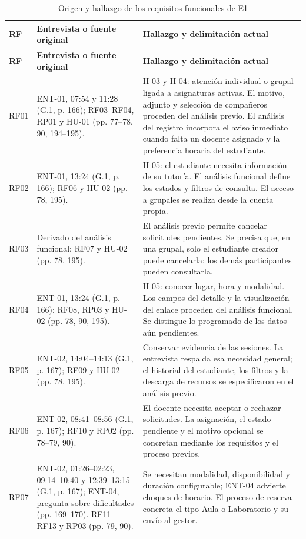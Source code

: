 \begingroup
\small
{}
\begin{longtable}{@{}p{}p{}p{}@{}}
\caption{Origen y hallazgo de los requisitos funcionales de E1}
\label{tab:anexo-origen-rf}\\
\toprule
\textbf{RF} & \textbf{Entrevista o fuente original} & \textbf{Hallazgo y delimitación actual}\\
\midrule
\endfirsthead
\toprule
\textbf{RF} & \textbf{Entrevista o fuente original} & \textbf{Hallazgo y delimitación actual}\\
\midrule
\endhead
RF01 & ENT-01, 07:54 y 11:28 (G.1, p. 166); RF03--RF04, RP01 y HU-01 (pp. 77--78, 90, 194--195). & H-03 y H-04: atención individual o grupal ligada a asignaturas activas. El motivo, adjunto y selección de compañeros proceden del análisis previo. El análisis del registro incorpora el aviso inmediato cuando falta un docente asignado y la preferencia horaria del estudiante.\\
RF02 & ENT-01, 13:24 (G.1, p. 166); RF06 y HU-02 (pp. 78, 195). & H-05: el estudiante necesita información de su tutoría. El análisis funcional define los estados y filtros de consulta. El acceso a grupales se realiza desde la cuenta propia.\\
RF03 & Derivado del análisis funcional: RF07 y HU-02 (pp. 78, 195). & El análisis previo permite cancelar solicitudes pendientes. Se precisa que, en una grupal, solo el estudiante creador puede cancelarla; los demás participantes pueden consultarla.\\
RF04 & ENT-01, 13:24 (G.1, p. 166); RF08, RP03 y HU-02 (pp. 78, 90, 195). & H-05: conocer lugar, hora y modalidad. Los campos del detalle y la visualización del enlace proceden del análisis funcional. Se distingue lo programado de los datos aún pendientes.\\
RF05 & ENT-02, 14:04--14:13 (G.1, p. 167); RF09 y HU-02 (pp. 78, 195). & Conservar evidencia de las sesiones. La entrevista respalda esa necesidad general; el historial del estudiante, los filtros y la descarga de recursos se especificaron en el análisis previo.\\
RF06 & ENT-02, 08:41--08:56 (G.1, p. 167); RF10 y RP02 (pp. 78--79, 90). & El docente necesita aceptar o rechazar solicitudes. La asignación, el estado pendiente y el motivo opcional se concretan mediante los requisitos y el proceso previos.\\
RF07 & ENT-02, 01:26--02:23, 09:14--10:40 y 12:39--13:15 (G.1, p. 167); ENT-04, pregunta sobre dificultades (pp. 169--170). RF11--RF13 y RP03 (pp. 79, 90). & Se necesitan modalidad, disponibilidad y duración configurable; ENT-04 advierte choques de horario. El proceso de reserva concreta el tipo Aula o Laboratorio y su envío al gestor.\\

\end{longtable}
